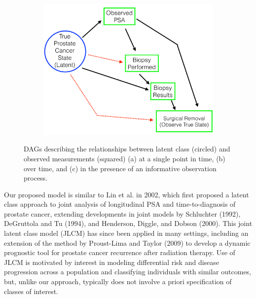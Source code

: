 \documentclass[12pt, letterpaper]{article}
\begin{document}
\begin{figure}
\begin{center}
\begin{subfigure}[b]{0.3\textwidth}
\includegraphics[width=\textwidth]{dag3}
\caption{}%
\label{fig:dag3}
\end{subfigure}
\caption{DAGs describing the relationships between latent class (circled) and observed measurements (squared) (a) at a single point in time, (b) over time, and (c) in the presence of an informative observation process.}
\end{center}
\end{figure}

Our proposed model is similar to Lin et al. in 2002\nocite{Lin2002}, which first proposed a latent class approach to joint analysis of longitudinal PSA and time-to-diagnosis of prostate cancer, extending developments in joint models by Schluchter (1992)\nocite{Schluchter1992}, DeGruttola and Tu (1994)\nocite{DeGruttola1994}, and Henderson, Diggle, and Dobson (2000)\nocite{Henderson2000}. This joint latent class model (JLCM) has since been applied in many settings, including an extension of the method by Proust-Lima and Taylor (2009)\nocite{Proust2009} to develop a dynamic prognostic tool for prostate cancer recurrence after radiation therapy. Use of JLCM is motivated by interest in modeling differential risk and disease progression across a population and classifying individuals with similar outcomes, but, unlike our approach, typically does not involve a priori specification of classes of interest. 
\end{document}
